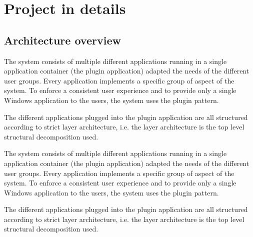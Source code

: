\chapter{Project in details}

\section{Architecture overview}
The system consists of multiple different applications running in a single application container (the plugin application) adapted the needs of the different user groups. Every application implements a specific group of aspect of the system. To enforce a consistent user experience and to provide only a single Windows application to the users, the system uses the plugin pattern.
\par
The different applications plugged into the plugin application are all structured according to strict layer architecture, i.e. the layer architecture is the top level structural decomposition used.	
\par
The system consists of multiple different applications running in a single application container (the plugin application) adapted the needs of the different user groups. Every application implements a specific group of aspect of the system. To enforce a consistent user experience and to provide only a single Windows application to the users, the system uses the plugin pattern.
\par
The different applications plugged into the plugin application are all structured according to strict layer architecture, i.e. the layer architecture is the top level structural decomposition used.
%
